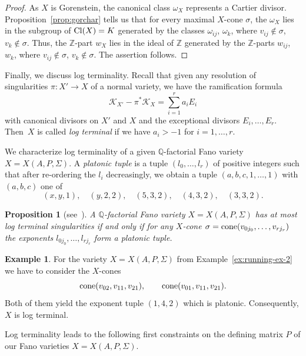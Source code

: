 \documentclass[10pt,a4paper]{amsart}
\newtheorem{prop}[thm]{Proposition}
\theoremstyle{definition}
\newtheorem{exam}[thm]{Example}
\def\Cl{{\rm Cl}}
\def\ZZ{{\mathbb Z}}
\def\QQ{{\mathbb Q}}
\def\cone{{\rm cone}}
\numberwithin{equation}{section}
\begin{document}
\begin{proof}
As $X$ is Gorenstein, the canonical class $\omega_X$
represents a Cartier divisor.
Proposition~\ref{prop:gorchar} tells us that for
every maximal $X$-cone $\sigma$,
the $\omega_X$ lies in the subgroup of $\Cl(X) =K$
generated by the classes
$\omega_{ij}$, $\omega_k$, where $v_{ij} \not\in \sigma$,
$v_k \not\in \sigma$.
Thus, the $\ZZ$-part $w_X$ lies in the ideal of $\ZZ$
generated by the $\ZZ$-parts $w_{ij}$, $w_k$,
where $v_{ij} \not\in \sigma$, $v_k \not\in \sigma$.
The assertion follows.
\end{proof}


Finally, we discuss log terminality.
Recall that given any resolution of
singularities $\pi \colon X' \to X$ of a normal
variety, we have the ramification
formula
\[
\mathcal{K}_{X'} - \pi^*\mathcal{K}_{X}
 =
\sum_{i=1}^r a_i E_i
\]
with canonical divisors on $X'$
and $X$ and the exceptional divisors
$E_i, \dots, E_r$.
Then~$X$ is called \emph{log terminal} if
we have $a_i > -1$ for $i = 1, \dots, r$.

We characterize log terminality of a given
$\QQ$-factorial Fano variety $X = X(A,P,\Sigma)$.
A \emph{platonic tuple} is a tuple
$(l_0,\dots,l_r)$ of positive integers
such that after re-ordering
the $l_i$ decreasingly, we obtain a tuple
$(a,b,c,1, \dots, 1)$ with $(a,b,c)$ one of
\[
(x,y,1),
\quad
(y,2,2),
\quad
(5,3,2),
\quad
(4,3,2),
\quad
(3,3,2).
\]


\begin{prop}[{see~\cite[Theorem~3.13]{ArBrHaWr}}]
\label{rem:platonictuples}
A $\QQ$-factorial Fano variety $X = X(A,P,\Sigma)$
has at most log terminal
singularities if and only if
for any $X$-cone
$\sigma = \cone(v_{0j_0}, \dots, v_{rj_r})$
the exponents $l_{0j_0}, \dots, l_{rj_r}$
form a platonic tuple.
\end{prop}

\begin{exam}
For the variety $X = X(A,P,\Sigma)$
from Example~\ref{ex:running-ex-2}
we have to consider the $X$-cones
\[
\cone(v_{02},v_{11},v_{21}),
\qquad
\cone(v_{01},v_{11},v_{21}).
\]
Both of them yield the exponent
tuple $(1,4,2)$ which is platonic.
Consequently, $X$ is log terminal.
\end{exam}

Log terminality leads to the following first
constraints on the defining matrix $P$ of our
Fano varieties $X = X(A,P,\Sigma)$.
\end{document}
